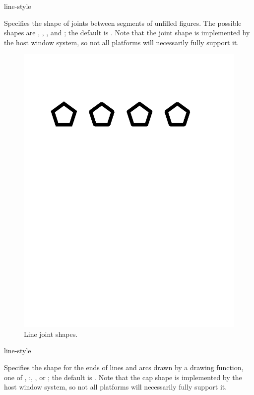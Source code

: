  {line-style}

Specifies the shape of joints between segments of unfilled figures.  The
possible shapes are , , , and ; the
default is .  Note that the joint shape is implemented by the host
window system, so not all platforms will necessarily fully support it.

\begin{figure}
\centerline{\includegraphics{line-joint-shapes}}
\caption{Line joint shapes.}
\end{figure}

 {line-style}

Specifies the shape for the ends of lines and arcs drawn by a drawing function,
one of , :, , or ; the default
is .  Note that the cap shape is implemented by the host window
system, so not all platforms will necessarily fully support it.

